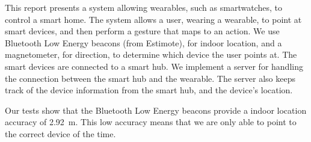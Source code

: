 This report presents a system allowing wearables, such as smartwatches, to control a smart home. The system allows a user, wearing a wearable, to point at smart devices, and then perform a gesture that maps to an action. We use Bluetooth Low Energy beacons (from Estimote), for indoor location, and a magnetometer, for direction, to determine which device the user points at. The smart devices are connected to a smart hub. We implement a server for handling the connection between the smart hub and the wearable. The server also keeps track of the device information from the smart hub, and the device's location. 

Our tests show that the Bluetooth Low Energy beacons provide a indoor location accuracy of \SI{2.92}{\meter}. This low accuracy means that we are only able to point to the correct device  of the time. 
